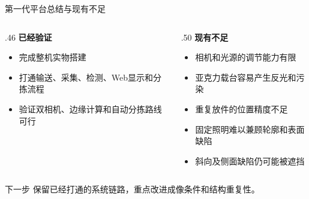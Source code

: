 \documentclass[aspectratio=169,10pt]{beamer}
\begin{document}
\begin{frame}{第一代平台总结与现有不足}
  \begin{columns}[T,onlytextwidth]
    \begin{column}{.46\textwidth}
      \textbf{已经验证}
      \begin{itemize}
        \item 完成整机实物搭建
        \item 打通输送、采集、检测、Web显示和分拣流程
        \item 验证双相机、边缘计算和自动分拣路线可行
      \end{itemize}
    \end{column}
    \begin{column}{.50\textwidth}
      \textbf{现有不足}
      \begin{itemize}
        \item 相机和光源的调节能力有限
        \item 亚克力载台容易产生反光和污染
        \item 重复放件的位置精度不足
        \item 固定照明难以兼顾轮廓和表面缺陷
        \item 斜向及侧面缺陷仍可能被遮挡
      \end{itemize}
    \end{column}
  \end{columns}

  \vfill
  \begin{block}{下一步}
    保留已经打通的系统链路，重点改进成像条件和结构重复性。
  \end{block}
\end{frame}

\end{document}
